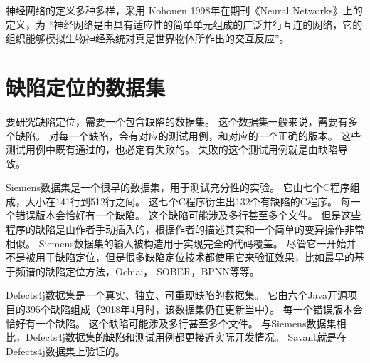 神经网络的定义多种多样，采用 Kohonen 1998年在期刊《Neural Networks》上的定义，为
“神经网络是由具有适应性的简单单元组成的广泛并行互连的网络，它的组织能够模拟生物神经系统对真是世界物体所作出的交互反应”。

\section{缺陷定位的数据集}

要研究缺陷定位，需要一个包含缺陷的数据集。
这个数据集一般来说，需要有多个缺陷。
对每一个缺陷，会有对应的测试用例，和对应的一个正确的版本。
这些测试用例中既有通过的，也必定有失败的。
失败的这个测试用例就是由缺陷导致。

Siemens数据集\parencite{Hutchins1994Experiments}是一个很早的数据集，用于测试充分性的实验。
它由七个C程序组成，大小在141行到512行之间。
这七个C程序衍生出132个有缺陷的C程序。
每一个错误版本会恰好有一个缺陷。
这个缺陷可能涉及多行甚至多个文件。
但是这些程序的缺陷是由作者手动插入的，根据作者的描述其实和一个简单的变异操作非常相似。
Siemens数据集的输入被构造用于实现完全的代码覆盖。
尽管它一开始并不是被用于缺陷定位，但是很多缺陷定位技术都使用它来验证效果，比如最早的基于频谱的缺陷定位方法\parencite{Renieres2003Fault}，Ochiai\parencite{Abreu2006An,Abreu2007On}，
SOBER\parencite{Liu2006Statistical}，BPNN\parencite{W2009BP}等等。

Defects4j数据集\parencite{Just2014Defects4J}是一个真实、独立、可重现缺陷的数据集。
它由六个Java开源项目的395个缺陷组成（2018年4月时，该数据集仍在更新当中）。
每一个错误版本会恰好有一个缺陷。
这个缺陷可能涉及多行甚至多个文件。
与Siemens数据集相比，Defects4j数据集的缺陷和测试用例都更接近实际开发情况。
Savant\parencite{Le2016A}就是在Defects4j数据集上验证的。
